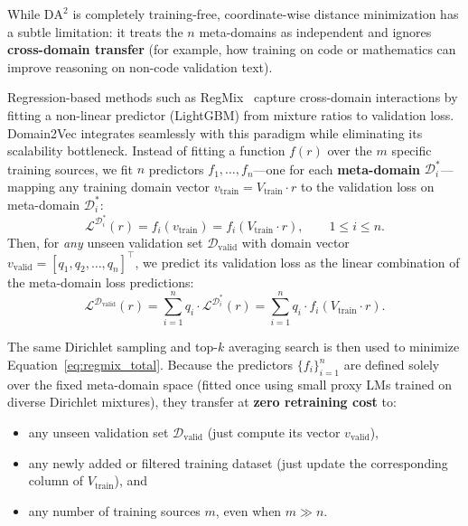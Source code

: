 \documentclass[12pt]{article}
\begin{document}
While $\mathrm{DA}^2$ is completely training-free, coordinate-wise distance minimization has a subtle limitation: it treats the $n$ meta-domains as independent and ignores \textbf{cross-domain transfer} (for example, how training on code or mathematics can improve reasoning on non-code validation text).

Regression-based methods such as RegMix~\cite{liu2024regmix} capture cross-domain interactions by fitting a non-linear predictor (LightGBM) from mixture ratios to validation loss. Domain2Vec integrates seamlessly with this paradigm while eliminating its scalability bottleneck. Instead of fitting a function $f(r)$ over the $m$ specific training sources, we fit $n$ predictors $f_1, \dots, f_n$—one for each \textbf{meta-domain} $\mathcal{D}_i^*$—mapping any training domain vector $v_{\text{train}} = V_{\text{train}} \cdot r$ to the validation loss on meta-domain $\mathcal{D}_i^*$:
\begin{equation}
\mathcal{L}^{\mathcal{D}_i^*}(r) = f_i(v_{\text{train}}) = f_i(V_{\text{train}} \cdot r), \qquad 1 \le i \le n.
\label{eq:regmix_meta}
\end{equation}
Then, for \emph{any} unseen validation set $\mathcal{D}_{\text{valid}}$ with domain vector $v_{\text{valid}} = [q_1, q_2, \dots, q_n]^\top$, we predict its validation loss as the linear combination of the meta-domain loss predictions:
\begin{equation}
\mathcal{L}^{\mathcal{D}_{\text{valid}}}(r) = \sum_{i=1}^{n} q_i \cdot \mathcal{L}^{\mathcal{D}_i^*}(r) = \sum_{i=1}^{n} q_i \cdot f_i(V_{\text{train}} \cdot r).
\label{eq:regmix_total}
\end{equation}

The same Dirichlet sampling and top-$k$ averaging search is then used to minimize Equation~\eqref{eq:regmix_total}. Because the predictors $\{f_i\}_{i=1}^n$ are defined solely over the fixed meta-domain space (fitted once using small proxy LMs trained on diverse Dirichlet mixtures), they transfer at \textbf{zero retraining cost} to:
\begin{itemize}
    \item any unseen validation set $\mathcal{D}_{\text{valid}}$ (just compute its vector $v_{\text{valid}}$),
    \item any newly added or filtered training dataset (just update the corresponding column of $V_{\text{train}}$), and
    \item any number of training sources $m$, even when $m \gg n$.
\end{itemize}
\end{document}
